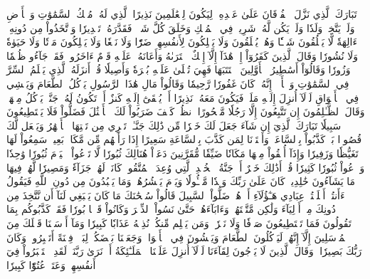 تَبَارَكَ ٱلَّذِي نَزَّلَ ٱلۡفُرۡقَانَ عَلَىٰ عَبۡدِهِۦ لِيَكُونَ لِلۡعَٰلَمِينَ نَذِيرًا
ٱلَّذِي لَهُۥ مُلۡكُ ٱلسَّمَٰوَٰتِ وَٱلۡأَرۡضِ وَلَمۡ يَتَّخِذۡ وَلَدٗا وَلَمۡ يَكُن لَّهُۥ شَرِيكٞ فِي ٱلۡمُلۡكِ وَخَلَقَ كُلَّ شَيۡءٖ فَقَدَّرَهُۥ تَقۡدِيرٗا
وَٱتَّخَذُواْ مِن دُونِهِۦٓ ءَالِهَةٗ لَّا يَخۡلُقُونَ شَيۡـٔٗا وَهُمۡ يُخۡلَقُونَ وَلَا يَمۡلِكُونَ لِأَنفُسِهِمۡ ضَرّٗا وَلَا نَفۡعٗا وَلَا يَمۡلِكُونَ مَوۡتٗا وَلَا حَيَوٰةٗ وَلَا نُشُورٗا
وَقَالَ ٱلَّذِينَ كَفَرُوٓاْ إِنۡ هَٰذَآ إِلَّآ إِفۡكٌ ٱفۡتَرَىٰهُ وَأَعَانَهُۥ عَلَيۡهِ قَوۡمٌ ءَاخَرُونَۖ فَقَدۡ جَآءُو ظُلۡمٗا وَزُورٗا
وَقَالُوٓاْ أَسَٰطِيرُ ٱلۡأَوَّلِينَ ٱكۡتَتَبَهَا فَهِيَ تُمۡلَىٰ عَلَيۡهِ بُكۡرَةٗ وَأَصِيلٗا
قُلۡ أَنزَلَهُ ٱلَّذِي يَعۡلَمُ ٱلسِّرَّ فِي ٱلسَّمَٰوَٰتِ وَٱلۡأَرۡضِۚ إِنَّهُۥ كَانَ غَفُورٗا رَّحِيمٗا
وَقَالُواْ مَالِ هَٰذَا ٱلرَّسُولِ يَأۡكُلُ ٱلطَّعَامَ وَيَمۡشِي فِي ٱلۡأَسۡوَاقِ لَوۡلَآ أُنزِلَ إِلَيۡهِ مَلَكٞ فَيَكُونَ مَعَهُۥ نَذِيرًا
أَوۡ يُلۡقَىٰٓ إِلَيۡهِ كَنزٌ أَوۡ تَكُونُ لَهُۥ جَنَّةٞ يَأۡكُلُ مِنۡهَاۚ وَقَالَ ٱلظَّـٰلِمُونَ إِن تَتَّبِعُونَ إِلَّا رَجُلٗا مَّسۡحُورًا
ٱنظُرۡ كَيۡفَ ضَرَبُواْ لَكَ ٱلۡأَمۡثَٰلَ فَضَلُّواْ فَلَا يَسۡتَطِيعُونَ سَبِيلٗا
تَبَارَكَ ٱلَّذِيٓ إِن شَآءَ جَعَلَ لَكَ خَيۡرٗا مِّن ذَٰلِكَ جَنَّـٰتٖ تَجۡرِي مِن تَحۡتِهَا ٱلۡأَنۡهَٰرُ وَيَجۡعَل لَّكَ قُصُورَۢا
بَلۡ كَذَّبُواْ بِٱلسَّاعَةِۖ وَأَعۡتَدۡنَا لِمَن كَذَّبَ بِٱلسَّاعَةِ سَعِيرًا
إِذَا رَأَتۡهُم مِّن مَّكَانِۭ بَعِيدٖ سَمِعُواْ لَهَا تَغَيُّظٗا وَزَفِيرٗا
وَإِذَآ أُلۡقُواْ مِنۡهَا مَكَانٗا ضَيِّقٗا مُّقَرَّنِينَ دَعَوۡاْ هُنَالِكَ ثُبُورٗا
لَّا تَدۡعُواْ ٱلۡيَوۡمَ ثُبُورٗا وَٰحِدٗا وَٱدۡعُواْ ثُبُورٗا كَثِيرٗا
قُلۡ أَذَٰلِكَ خَيۡرٌ أَمۡ جَنَّةُ ٱلۡخُلۡدِ ٱلَّتِي وُعِدَ ٱلۡمُتَّقُونَۚ كَانَتۡ لَهُمۡ جَزَآءٗ وَمَصِيرٗا
لَّهُمۡ فِيهَا مَا يَشَآءُونَ خَٰلِدِينَۚ كَانَ عَلَىٰ رَبِّكَ وَعۡدٗا مَّسۡـُٔولٗا
وَيَوۡمَ يَحۡشُرُهُمۡ وَمَا يَعۡبُدُونَ مِن دُونِ ٱللَّهِ فَيَقُولُ ءَأَنتُمۡ أَضۡلَلۡتُمۡ عِبَادِي هَـٰٓؤُلَآءِ أَمۡ هُمۡ ضَلُّواْ ٱلسَّبِيلَ
قَالُواْ سُبۡحَٰنَكَ مَا كَانَ يَنۢبَغِي لَنَآ أَن نَّتَّخِذَ مِن دُونِكَ مِنۡ أَوۡلِيَآءَ وَلَٰكِن مَّتَّعۡتَهُمۡ وَءَابَآءَهُمۡ حَتَّىٰ نَسُواْ ٱلذِّكۡرَ وَكَانُواْ قَوۡمَۢا بُورٗا
فَقَدۡ كَذَّبُوكُم بِمَا تَقُولُونَ فَمَا تَسۡتَطِيعُونَ صَرۡفٗا وَلَا نَصۡرٗاۚ وَمَن يَظۡلِم مِّنكُمۡ نُذِقۡهُ عَذَابٗا كَبِيرٗا
وَمَآ أَرۡسَلۡنَا قَبۡلَكَ مِنَ ٱلۡمُرۡسَلِينَ إِلَّآ إِنَّهُمۡ لَيَأۡكُلُونَ ٱلطَّعَامَ وَيَمۡشُونَ فِي ٱلۡأَسۡوَاقِۗ وَجَعَلۡنَا بَعۡضَكُمۡ لِبَعۡضٖ فِتۡنَةً أَتَصۡبِرُونَۗ وَكَانَ رَبُّكَ بَصِيرٗا
۞وَقَالَ ٱلَّذِينَ لَا يَرۡجُونَ لِقَآءَنَا لَوۡلَآ أُنزِلَ عَلَيۡنَا ٱلۡمَلَـٰٓئِكَةُ أَوۡ نَرَىٰ رَبَّنَاۗ لَقَدِ ٱسۡتَكۡبَرُواْ فِيٓ أَنفُسِهِمۡ وَعَتَوۡ عُتُوّٗا كَبِيرٗا
